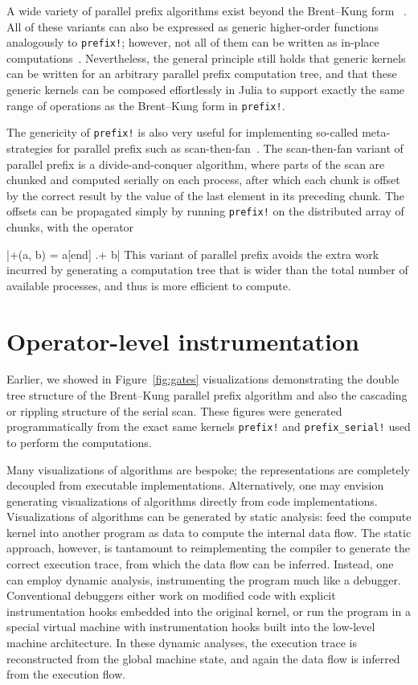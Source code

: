 \documentclass{sig-alternate}
\newcommand{\code}[1]{\texttt{#1}}
\begin{document}
A wide variety of parallel prefix algorithms exist beyond the Brent--Kung form
~\cite{Blelloch1989,Egecioglu1992,Kogge1973,Kruskal1985,Ladner1980,Ofman1963,Sklansky1960,Sanders2006,Sengupta2007,Wang1996}.
All of these variants can also be expressed as generic higher-order functions
analogously to \code{prefix!}; however, not all of them can be written as
in-place computations~\cite{Merrill2009}. Nevertheless, the general principle
still holds that generic kernels can be written for an arbitrary parallel
prefix computation tree, and that these generic kernels can be composed
effortlessly in Julia to support exactly the same range of operations as the
Brent--Kung form in \code{prefix!}.

The genericity of \code{prefix!} is also very useful for implementing
so-called meta-strategies for parallel prefix such as
scan-then-fan~\cite{Merrill2009,Wilt2013}. The scan-then-fan variant of
parallel prefix is a divide-and-conquer algorithm, where parts of the scan are
chunked and computed serially on each process, after which each chunk is
offset by the correct result by the value of the last element in its preceding
chunk. The offsets can be propagated simply by running \code{prefix!} on the
distributed array of chunks, with the operator

|+(a, b) = a[end] .+ b|
%
This variant of parallel prefix avoids the extra work incurred by generating a
computation tree that is wider than the total number of available processes,
and thus is more efficient to compute.

\section{Operator-level instrumentation}

Earlier, we showed in Figure~\ref{fig:gates} visualizations demonstrating the
double tree structure of the Brent--Kung parallel prefix algorithm and also the
cascading or rippling structure of the serial scan. These figures were
generated programmatically from the exact same kernels \code{prefix!} and
\code{prefix\_serial!} used to perform the computations.

Many visualizations of algorithms are bespoke; the representations are
completely decoupled from executable implementations. Alternatively, one may
envision generating visualizations of algorithms directly from code
implementations. Visualizations of algorithms can be generated by static
analysis: feed the compute kernel into another program as data to compute the
internal data flow. The static approach, however, is tantamount to
reimplementing the compiler to generate the correct execution trace, from which
the data flow can be inferred. Instead, one can employ dynamic analysis,
instrumenting the program much like a debugger. Conventional debuggers either
work on modified code with explicit instrumentation hooks embedded into the
original kernel, or run the program in a special virtual machine with
instrumentation hooks built into the low-level machine architecture. In these
dynamic analyses, the execution trace is reconstructed from the global machine
state, and again the data flow is inferred from the execution flow.
\end{document}
